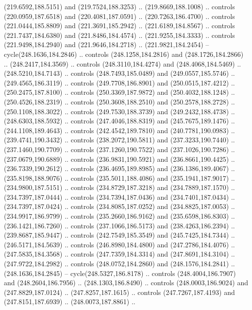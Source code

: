 \begin{scope}[cm={{1.25,0.0,0.0,-1.25,(0.0,442.91375)}}]
    (219.6592,188.5151) and (219.7524,188.3253) .. (219.8669,188.1008) .. controls
    (220.0959,187.6518) and (220.4081,187.0591) .. (220.7263,186.4700) .. controls
    (221.0444,185.8809) and (221.3691,185.2942) .. (221.6189,184.8567) .. controls
    (221.7437,184.6380) and (221.8486,184.4574) .. (221.9255,184.3333) .. controls
    (221.9498,184.2940) and (221.9646,184.2718) .. (221.9821,184.2454) --
    cycle(248.1636,184.2846) .. controls (248.1258,184.2816) and
    (248.1726,184.2866) .. (248.2417,184.3569) .. controls (248.3110,184.4274) and
    (248.4068,184.5469) .. (248.5210,184.7143) .. controls (248.7493,185.0489) and
    (249.0557,185.5746) .. (249.4565,186.3119) .. controls (249.7708,186.8901) and
    (250.0515,187.4212) .. (250.2475,187.8100) .. controls (250.3369,187.9872) and
    (250.4032,188.1248) .. (250.4526,188.2319) .. controls (250.3608,188.2510) and
    (250.2578,188.2728) .. (250.1108,188.3022) .. controls (249.7530,188.3739) and
    (249.2432,188.4738) .. (248.6303,188.5932) .. controls (247.4046,188.8319) and
    (245.7675,189.1476) .. (244.1108,189.4643) .. controls (242.4542,189.7810) and
    (240.7781,190.0983) .. (239.4741,190.3432) .. controls (238.2072,190.5811) and
    (237.3233,190.7440) .. (237.1460,190.7709) .. controls (237.1260,190.7522) and
    (237.1026,190.7286) .. (237.0679,190.6889) .. controls (236.9831,190.5921) and
    (236.8661,190.4425) .. (236.7339,190.2612) .. controls (236.4695,189.8985) and
    (236.1386,189.4067) .. (235.8198,188.9076) .. controls (235.5011,188.4086) and
    (235.1941,187.9017) .. (234.9800,187.5151) .. controls (234.8729,187.3218) and
    (234.7889,187.1570) .. (234.7397,187.0444) .. controls (234.7394,187.0436) and
    (234.7401,187.0434) .. (234.7397,187.0424) .. controls (234.8085,187.0252) and
    (234.8825,187.0053) .. (234.9917,186.9799) .. controls (235.2660,186.9162) and
    (235.6598,186.8303) .. (236.1421,186.7260) .. controls (237.1066,186.5173) and
    (238.4263,186.2394) .. (239.8687,185.9447) .. controls (242.7549,185.3549) and
    (245.7425,184.7344) .. (246.5171,184.5639) .. controls (246.8980,184.4800) and
    (247.2786,184.4076) .. (247.5835,184.3568) .. controls (247.7359,184.3314) and
    (247.8691,184.3104) .. (247.9722,184.2982) .. controls (248.0752,184.2860) and
    (248.1576,184.2841) .. (248.1636,184.2845) -- cycle(248.5327,186.8178) ..
    controls (248.4004,186.7907) and (248.2604,186.7956) .. (248.1303,186.8490) ..
    controls (248.0003,186.9024) and (247.8829,187.0124) .. (247.8257,187.1615) ..
    controls (247.7267,187.4193) and (247.8151,187.6939) .. (248.0073,187.8861) ..

\end{scope}
